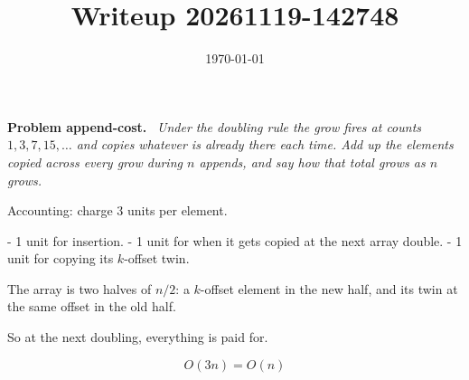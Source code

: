 \documentclass[11pt]{article}
\title{Writeup 20261119-142748}
\author{}
\date{\today}
\newenvironment{problem}[1]
  {\par\medskip\noindent\textbf{Problem #1.}\ \itshape}
  {\par\medskip}
\begin{document}
\maketitle


\begin{problem}{append-cost}
Under the doubling rule the grow fires at counts $1, 3, 7, 15, \dots$ and copies whatever is already there each time. Add up the elements copied across every grow during $n$ appends, and say how that total grows as $n$ grows.
\end{problem}
Accounting: charge 3 units per element.

- 1 unit for insertion.
- 1 unit for when it gets copied at the next array double.
- 1 unit for copying its $k$-offset twin.

The array is two halves of $n/2$: a $k$-offset element in the new half, and its twin at the same offset in the old half.

So at the next doubling, everything is paid for.

$$O(3n) = O(n)$$
\end{document}
